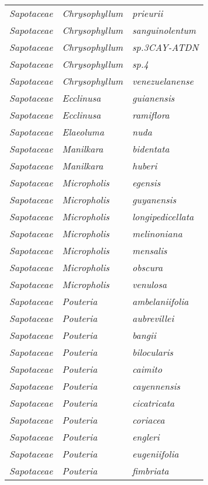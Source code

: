 \documentclass[fleqn,10pt]{ArtEcoFoG} %
\renewenvironment{table}{\begin{table*}}{\end{table*}\ignorespacesafterend}
\begin{document}
\begin{table}
\begin{tabular}[t]{lll}
\em{Sapotaceae} & \em{Chrysophyllum} & \em{prieurii}\\
\em{Sapotaceae} & \em{Chrysophyllum} & \em{sanguinolentum}\\
\em{Sapotaceae} & \em{Chrysophyllum} & \em{sp.3CAY-ATDN}\\
\em{Sapotaceae} & \em{Chrysophyllum} & \em{sp.4}\\
\addlinespace
\em{Sapotaceae} & \em{Chrysophyllum} & \em{venezuelanense}\\
\em{Sapotaceae} & \em{Ecclinusa} & \em{guianensis}\\
\em{Sapotaceae} & \em{Ecclinusa} & \em{ramiflora}\\
\em{Sapotaceae} & \em{Elaeoluma} & \em{nuda}\\
\em{Sapotaceae} & \em{Manilkara} & \em{bidentata}\\
\addlinespace
\em{Sapotaceae} & \em{Manilkara} & \em{huberi}\\
\em{Sapotaceae} & \em{Micropholis} & \em{egensis}\\
\em{Sapotaceae} & \em{Micropholis} & \em{guyanensis}\\
\em{Sapotaceae} & \em{Micropholis} & \em{longipedicellata}\\
\em{Sapotaceae} & \em{Micropholis} & \em{melinoniana}\\
\addlinespace
\em{Sapotaceae} & \em{Micropholis} & \em{mensalis}\\
\em{Sapotaceae} & \em{Micropholis} & \em{obscura}\\
\em{Sapotaceae} & \em{Micropholis} & \em{venulosa}\\
\em{Sapotaceae} & \em{Pouteria} & \em{ambelaniifolia}\\
\em{Sapotaceae} & \em{Pouteria} & \em{aubrevillei}\\
\addlinespace
\em{Sapotaceae} & \em{Pouteria} & \em{bangii}\\
\em{Sapotaceae} & \em{Pouteria} & \em{bilocularis}\\
\em{Sapotaceae} & \em{Pouteria} & \em{caimito}\\
\em{Sapotaceae} & \em{Pouteria} & \em{cayennensis}\\
\em{Sapotaceae} & \em{Pouteria} & \em{cicatricata}\\
\addlinespace
\em{Sapotaceae} & \em{Pouteria} & \em{coriacea}\\
\em{Sapotaceae} & \em{Pouteria} & \em{engleri}\\
\em{Sapotaceae} & \em{Pouteria} & \em{eugeniifolia}\\
\em{Sapotaceae} & \em{Pouteria} & \em{fimbriata}\\

\end{tabular}
\end{table}
\end{document}
